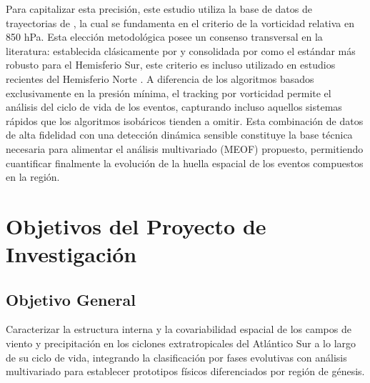 Para capitalizar esta precisión, este estudio utiliza la base de datos de trayectorias de \citet{coutodesouza2024new}, la cual se fundamenta en el criterio de la vorticidad relativa en 850 hPa. Esta elección metodológica posee un consenso transversal en la literatura: establecida clásicamente por \citet{sinclair1994objective} y consolidada por \citet{padilhareinke2024objective} como el estándar más robusto para el Hemisferio Sur, este criterio es incluso utilizado en estudios recientes del Hemisferio Norte \citep{chen2025characteristics}. 
A diferencia de los algoritmos basados exclusivamente en la presión mínima, el tracking por vorticidad permite el análisis del ciclo de vida de los eventos, capturando incluso aquellos sistemas rápidos que los algoritmos isobáricos tienden a omitir. Esta combinación de datos de alta fidelidad con una detección dinámica sensible constituye la base técnica necesaria para alimentar el análisis multivariado (MEOF) propuesto, permitiendo cuantificar finalmente la evolución de la huella espacial de los eventos compuestos en la región.
\section{Objetivos del Proyecto de Investigación}

\subsection{Objetivo General}
Caracterizar la estructura interna y la covariabilidad espacial de los campos de viento y precipitación en los ciclones extratropicales del Atlántico Sur a lo largo de su ciclo de vida, integrando la clasificación por fases evolutivas con análisis multivariado para establecer prototipos físicos diferenciados por región de génesis.

